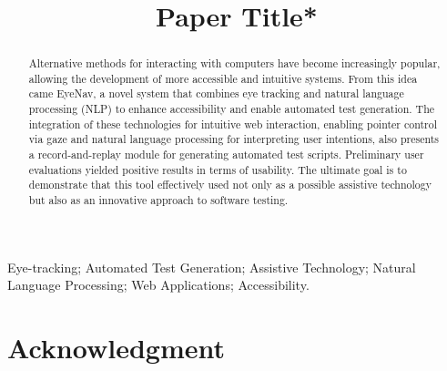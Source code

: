 \documentclass[10pt, conference]{IEEEtran}
\begin{document}
\title{Paper Title*}

\author{
\and
{}
}

\maketitle

\begin{abstract}

Alternative methods for interacting with computers have become increasingly popular, allowing the development of more accessible and intuitive systems. From this idea came EyeNav, a novel system that combines eye tracking and natural language processing (NLP) to enhance accessibility and enable automated test generation. The integration of these technologies for intuitive web interaction, enabling pointer control via gaze and natural language processing for interpreting user intentions, also presents a record-and-replay module for generating automated test scripts. Preliminary user evaluations yielded positive results in terms of usability. The ultimate goal is to demonstrate that this tool effectively used not only as a possible assistive technology but also as an innovative approach to software testing.


\end{abstract}

\begin{IEEEkeywords}
Eye-tracking; Automated Test Generation; Assistive Technology; Natural Language Processing; Web Applications; Accessibility.
\end{IEEEkeywords}










\section*{Acknowledgment}


\balance


\end{document}
